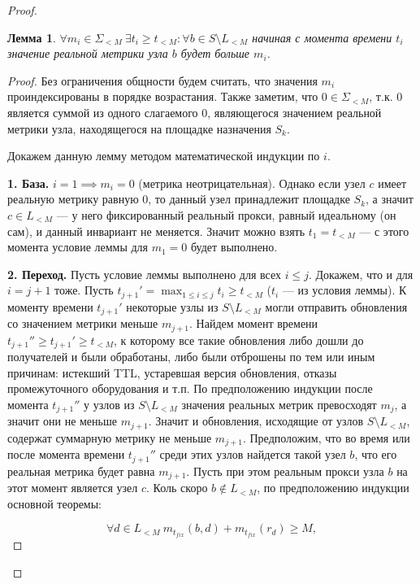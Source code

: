 \documentclass{article}
\theoremstyle{plain}
\theoremstyle{plain}
\theoremstyle{plain}
\newtheorem{lemma}{Лемма}[section]
\theoremstyle{plain}
\theoremstyle{definition}
\theoremstyle{remark}
\theoremstyle{plain}
\begin{document}
\begin{proof}
    \begin{lemma}
    \label{DecayLemma}
        $\forall m_i \in \Sigma_{< M}\ \exists t_i \geq t_{< M} \colon \forall b \in S \setminus L_{< M}$ начиная с момента времени $t_i$ значение реальной метрики узла $b$ будет больше $m_i$.
    \end{lemma}
    \begin{proof}
        Без ограничения общности будем считать, что значения $m_i$ проиндексированы в порядке возрастания. Также заметим, что $0 \in \Sigma_{< M}$, т.к. $0$ является суммой из одного слагаемого $0$, являющегося значением реальной метрики узла, находящегося на площадке назначения $S_k$.
        
        Докажем данную лемму методом математической индукции по $i$.
        
        \textbf{1. База.} $i = 1 \implies m_i = 0$ (метрика неотрицательная). Однако если узел $c$ имеет реальную метрику равную $0$, то данный узел принадлежит площадке $S_k$, а значит $c \in L_{< M}$ --- у него фиксированный реальный прокси, равный идеальному (он сам), и данный инвариант не меняется. Значит можно взять $t_1 = t_{< M}$ --- с этого момента условие леммы для $m_1 = 0$ будет выполнено.
        
        \textbf{2. Переход.} Пусть условие леммы выполнено для всех $i \leq j$. Докажем, что и для $i = j + 1$ тоже. Пусть $t_{j + 1}' = \displaystyle \max_{1 \leq i \leq j} t_i \geq t_{< M}$ ($t_i$ --- из условия леммы). К моменту времени $t_{j + 1}'$ некоторые узлы из $S \setminus L_{< M}$ могли отправить обновления со значением метрики меньше $m_{j + 1}$. Найдем момент времени $t_{j + 1}'' \geq t_{j + 1}' \geq t_{< M}$, к которому все такие обновления либо дошли до получателей и были обработаны, либо были отброшены по тем или иным причинам: истекший TTL, устаревшая версия обновления, отказы промежуточного оборудования и т.п. По предположению индукции после момента $t_{j + 1}''$ у узлов из $S \setminus L_{< M}$ значения реальных метрик превосходят $m_j$, а значит они не меньше $m_{j + 1}$. Значит и обновления, исходящие от узлов $S \setminus L_{< M}$, содержат суммарную метрику не меньше $m_{j + 1}$. Предположим, что во время или после момента времени $t_{j + 1}''$ среди этих узлов найдется такой узел $b$, что его реальная метрика будет равна $m_{j + 1}$. Пусть при этом реальным прокси узла $b$ на этот момент является узел $c$. Коль скоро $b \notin L_{< M}$, по предположению индукции основной теоремы:
        
        \begin{equation}
        \label{CantImproveByStable}
            \forall d \in L_{< M}\ m_{t_{fix}}(b, d) + m_{t_{fix}}(r_d) \geq M,
        \end{equation}
        

\end{proof}
\end{proof}
\end{document}
